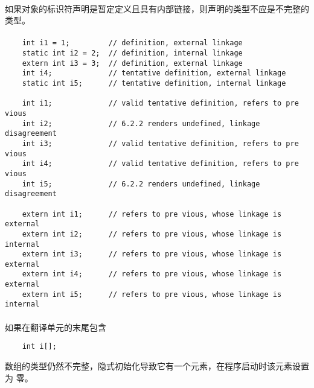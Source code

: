 {\paragraph{}
如果对象的标识符声明是暂定定义且具有内部链接，则声明的类型不应是不完整的类型。

\paragraph{}
\ex
\begin{lstlisting}
    int i1 = 1;         // definition, external linkage
    static int i2 = 2;  // definition, internal linkage
    extern int i3 = 3;  // definition, external linkage
    int i4;             // tentative definition, external linkage
    static int i5;      // tentative definition, internal linkage

    int i1;             // valid tentative definition, refers to pre vious
    int i2;             // 6.2.2 renders undefined, linkage disagreement
    int i3;             // valid tentative definition, refers to pre vious
    int i4;             // valid tentative definition, refers to pre vious
    int i5;             // 6.2.2 renders undefined, linkage disagreement

    extern int i1;      // refers to pre vious, whose linkage is external
    extern int i2;      // refers to pre vious, whose linkage is internal
    extern int i3;      // refers to pre vious, whose linkage is external
    extern int i4;      // refers to pre vious, whose linkage is external
    extern int i5;      // refers to pre vious, whose linkage is internal
\end{lstlisting}

\paragraph{}
\ex 如果在翻译单元的末尾包含
\begin{lstlisting}
    int i[];
\end{lstlisting}
数组的类型仍然不完整，隐式初始化导致它有一个元素，在程序启动时该元素设置为
零。

\syntax
}
